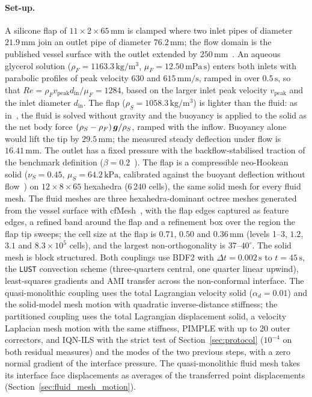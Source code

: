 \paragraph{Set-up.}
A silicone flap of $11\times2\times65\,\mathrm{mm}$ is clamped where two inlet pipes of diameter $21.9\,\mathrm{mm}$ join an outlet pipe of diameter $76.2\,\mathrm{mm}$; the flow domain is the published vessel surface with the outlet extended by $250\,\mathrm{mm}$~\citep{Hessenthaler2017a}.
An aqueous glycerol solution ($\rho_F = 1163.3\,\mathrm{kg/m^3}$, $\mu_F = 12.50\,\mathrm{mPa\,s}$) enters both inlets with parabolic profiles of peak velocity $630$ and $615\,\mathrm{mm/s}$, ramped in over $0.5\,\mathrm{s}$, so that $Re = \rho_F v_\mathrm{peak} d_\mathrm{in}/\mu_F = 1284$, based on the larger inlet peak velocity $v_\mathrm{peak}$ and the inlet diameter $d_\mathrm{in}$.
The flap ($\rho_S = 1058.3\,\mathrm{kg/m^3}$) is lighter than the fluid: as in~\citet{Hessenthaler2017b}, the fluid is solved without gravity and the buoyancy is applied to the solid as the net body force $(\rho_S - \rho_F)\,\boldsymbol{g}/\rho_S$, ramped with the inflow.
Buoyancy alone would lift the tip by $29.5\,\mathrm{mm}$; the measured steady deflection under flow is $16.41\,\mathrm{mm}$.
The outlet has a fixed pressure with the backflow-stabilised traction of the benchmark definition ($\beta = 0.2$~\citep{Hessenthaler2017b}).
The flap is a compressible neo-Hookean solid ($\nu_S = 0.45$, $\mu_S = 64.2\,\mathrm{kPa}$, calibrated against the buoyant deflection without flow~\citep{CardiffFSIVerification2026}) on $12\times8\times65$ hexahedra (6\,240 cells), the same solid mesh for every fluid mesh.
The fluid meshes are three hexahedra-dominant octree meshes generated from the vessel surface with cfMesh~\citep{cfMesh}, with the flap edges captured as feature edges, a refined band around the flap and a refinement box over the region the flap tip sweeps; the cell size at the flap is $0.71$, $0.50$ and $0.36\,\mathrm{mm}$ (levels 1--3, $1.2$, $3.1$ and $8.3\times10^{5}$ cells), and the largest non-orthogonality is $37$--$40^\circ$.
The solid mesh is block structured.
Both couplings use BDF2 with $\Delta t = 0.002\,\mathrm{s}$ to $t = 45\,\mathrm{s}$, the \texttt{LUST} convection scheme (three-quarters central, one quarter linear upwind), least-squares gradients and AMI transfer across the non-conformal interface.
The quasi-monolithic coupling uses the total Lagrangian velocity solid ($\alpha_d = 0.01$) and the solid-model mesh motion with quadratic inverse-distance stiffness; the partitioned coupling uses the total Lagrangian displacement solid, a velocity Laplacian mesh motion with the same stiffness, PIMPLE with up to 20 outer correctors, and IQN-ILS with the strict test of Section~\ref{sec:protocol} ($10^{-4}$ on both residual measures) and the modes of the two previous steps, with a zero normal gradient of the interface pressure.
The quasi-monolithic fluid mesh takes its interface face displacements as averages of the transferred point displacements (Section~\ref{sec:fluid_mesh_motion}).

